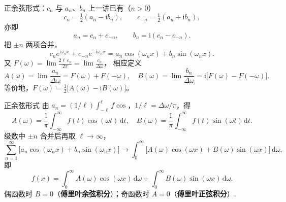 \documentclass[fontset=windows, chinese, 10pt, xcolor=dvipsnames]{beamer}
\begin{document}
\begin{frame}{正余弦形式：$c_n$ 与 $a_n$、$b_n$}
  上一讲已有（$n>0$）
  \begin{equation*}
    c_n=\tfrac12(a_n-\mathrm{i}b_n),
    \qquad
    c_{-n}=\tfrac12(a_n+\mathrm{i}b_n),
  \end{equation*}
  亦即
  \begin{equation*}
    a_n=c_n+c_{-n},
    \qquad
    b_n=\mathrm{i}(c_n-c_{-n}).
  \end{equation*}
  把 $\pm n$ 两项合并，
  \begin{equation*}
    c_n e^{\mathrm{i}\omega_n x}+c_{-n}e^{-\mathrm{i}\omega_n x}
    =a_n\cos(\omega_n x)+b_n\sin(\omega_n x).
  \end{equation*}
  又 $F(\omega)=\displaystyle\lim\frac{2\ell\,c_n}{2\pi}=\lim\frac{c_n}{\Delta\omega}$，
  相应定义
  \begin{equation*}
    A(\omega)=\lim\frac{a_n}{\Delta\omega}=F(\omega)+F(-\omega),
    \quad
    B(\omega)=\lim\frac{b_n}{\Delta\omega}
      =\mathrm{i}\bigl[F(\omega)-F(-\omega)\bigr].
  \end{equation*}
  等价地，$F(\omega)=\tfrac12\bigl[A(\omega)-\mathrm{i}B(\omega)\bigr]$。
\end{frame}

\begin{frame}{正余弦形式}
  由 $a_n=(1/\ell)\int_{-\ell}^{\ell}f\cos$，$1/\ell=\Delta\omega/\pi$，得
  \begin{equation*}
    A(\omega)=\frac{1}{\pi}\int_{-\infty}^{\infty} f(t)\cos(\omega t)\,\mathrm{d}t,
    \quad
    B(\omega)=\frac{1}{\pi}\int_{-\infty}^{\infty} f(t)\sin(\omega t)\,\mathrm{d}t.
  \end{equation*}
  级数中 $\pm n$ 合并后再取 $\ell\to\infty$，
  \begin{equation*}
    \sum_{n=1}^{\infty}
      \bigl[a_n\cos(\omega_n x)+b_n\sin(\omega_n x)\bigr]
    \longrightarrow
    \int_0^{\infty}
      \bigl[A(\omega)\cos(\omega x)+B(\omega)\sin(\omega x)\bigr]
      \,\mathrm{d}\omega,
  \end{equation*}
  即
  \begin{equation*}
    f(x)=\int_0^{\infty} A(\omega)\cos(\omega x)\,\mathrm{d}\omega
        +\int_0^{\infty} B(\omega)\sin(\omega x)\,\mathrm{d}\omega.
  \end{equation*}
  偶函数时 $B=0$（\textbf{傅里叶余弦积分}）；奇函数时 $A=0$（\textbf{傅里叶正弦积分}）.
\end{frame}
\end{document}
